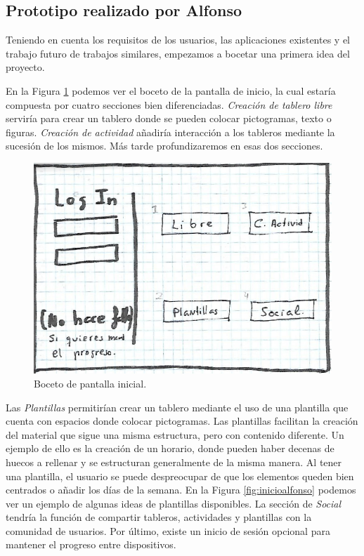 \subsection{Prototipo realizado por Alfonso}
\label{cap4:sec:alfonso}
Teniendo en cuenta los requisitos de los usuarios, las aplicaciones existentes y el trabajo futuro de trabajos similares, empezamos a bocetar una primera idea del proyecto.


En la Figura \ref{fig:loginalfonso} podemos ver el boceto de la pantalla de inicio, la cual estaría compuesta por cuatro secciones bien diferenciadas. \textit{Creación de tablero libre} serviría para crear un tablero donde se pueden colocar pictogramas, texto o figuras. \textit{Creación de actividad} añadiría interacción a los tableros mediante la sucesión de los mismos. Más tarde profundizaremos en esas dos secciones.

\begin{figure}[h!]
	\centering
	\includegraphics[width=0.7\linewidth]{Imagenes/Bitmap/logInAlfonso}
	\caption{Boceto de pantalla inicial.}
	\label{fig:loginalfonso}
\end{figure}

Las \textit{Plantillas} permitirían crear un tablero mediante el uso de una plantilla que cuenta con espacios donde colocar pictogramas. Las plantillas facilitan la creación del material que sigue una misma estructura, pero con contenido diferente. Un ejemplo de ello es la creación de un horario, donde pueden haber decenas de huecos a rellenar y se estructuran generalmente de la misma manera. Al tener una plantilla, el usuario se puede despreocupar de que los elementos queden bien centrados o añadir los días de la semana. En la Figura \ref{fig:inicioalfonso} podemos ver un ejemplo de algunas ideas de plantillas disponibles. 
La sección de \textit{Social} tendría la función de compartir tableros, actividades y plantillas con la comunidad de usuarios. Por último, existe un inicio de sesión opcional para mantener el progreso entre dispositivos.

